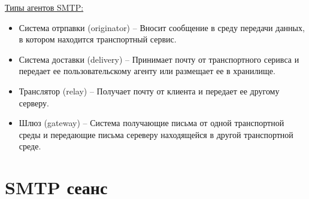 \documentclass[a4paper,12pt]{report}
\begin{document}
	 \underline{Типы агентов SMTP:}
	 
	 \begin{itemize}
	     \item Система отрпавки (originator) -- Вносит сообщение в среду передачи данных, в котором находится транспортный сервис.
	     \item Система доставки (delivery) -- Принимает почту от транспортного серивса и передает ее пользовательскому агенту или размещает ее в хранилище.
	     \item Транслятор (relay) -- Получает почту от клиента и передает ее другому серверу.
	     \item Шлюз (gateway) -- Система получающие письма от одной транспортной среды и передающие письма сереверу находящейся в другой транспортной среде.
	 \end{itemize}
	 
	 
	 \section{SMTP сеанс}
	 
\end{document}
